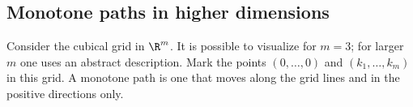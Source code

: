 \subsection{Monotone paths in higher dimensions}
Consider the cubical grid in $\R^m$.
It is possible to visualize for $m=3$; for larger $m$ one uses an abstract description.
Mark the points $(0, \ldots, 0)$ and $(k_1, \ldots, k_m)$ in this grid.
A monotone path is one that moves along the grid lines and in the positive directions only.
